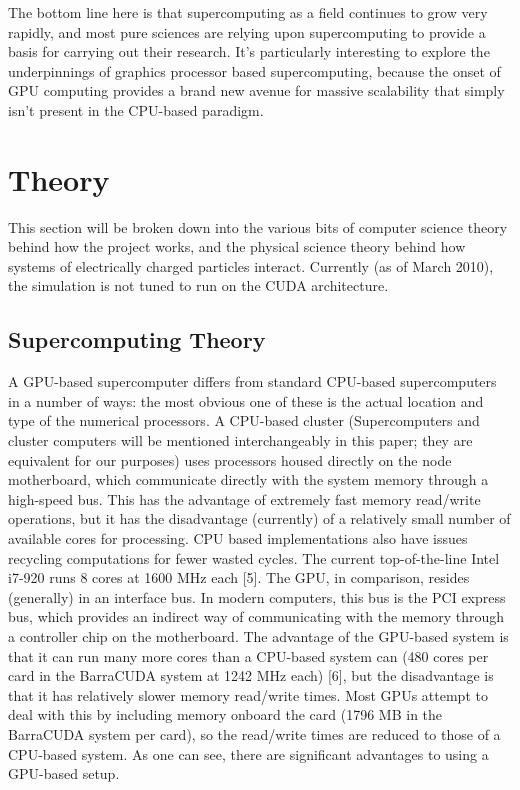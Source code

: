 \documentclass[10pt]{article}
\begin{document}
The bottom line here is that supercomputing as a field continues to grow very rapidly, and most pure sciences are relying upon supercomputing to provide a basis for carrying out their research. It's particularly interesting to explore the underpinnings of graphics processor based supercomputing, because the onset of GPU computing provides a brand new avenue for massive scalability that simply isn't present in the CPU-based paradigm.

\section{Theory}
This section will be broken down into the various bits of computer science theory behind how the project works, and the physical science theory behind how systems of electrically charged particles interact. Currently (as of March 2010), the simulation is not tuned to run on the CUDA architecture.

\subsection{Supercomputing Theory}
A GPU-based supercomputer differs from standard CPU-based supercomputers in a number of ways: the most obvious one of these is the actual location and type of the numerical processors. A CPU-based cluster (Supercomputers and cluster computers will be mentioned interchangeably in this paper; they are equivalent for our purposes) uses processors housed directly on the node motherboard, which communicate directly with the system memory through a high-speed bus. This has the advantage of extremely fast memory read/write operations, but it has the disadvantage (currently) of a relatively small number of available cores for processing. CPU based implementations also have issues recycling computations for fewer wasted cycles. The current top-of-the-line Intel i7-920 runs 8 cores at 1600 MHz each [5]. The GPU, in comparison, resides (generally) in an interface bus. In modern computers, this bus is the PCI express bus, which provides an indirect way of communicating with the memory through a controller chip on the motherboard. The advantage of the GPU-based system is that it can run many more cores than a CPU-based system can (480 cores per card in the BarraCUDA system at 1242 MHz each) [6], but the disadvantage is that it has relatively slower memory read/write times. Most GPUs attempt to deal with this by including memory onboard the card (1796 MB in the BarraCUDA system per card), so the read/write times are reduced to those of a CPU-based system. As one can see, there are significant advantages to using a GPU-based setup.
\end{document}
